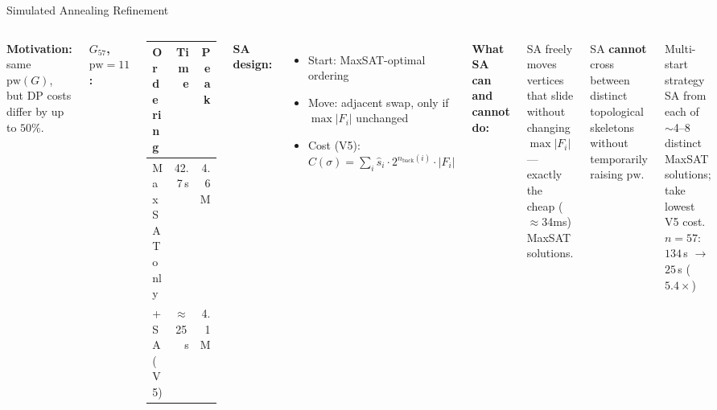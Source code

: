 \documentclass[aspectratio=169,t]{beamer}
\newcommand{\pw}{\mathrm{pw}}
\newcommand{\nb}{n_{\mathrm{back}}}
\begin{document}
\begin{frame}{Simulated Annealing Refinement}
\small
\begin{columns}[c]
\textbf{Motivation:} same $\pw(G)$, but DP costs differ by up to $50\%$.

\vspace{0.15cm}
\textbf{$G_{57}$, $\pw = 11$:}
\begin{center}\small
\begin{tabular}{lrr}
\toprule
Ordering & Time & Peak \\
\midrule
MaxSAT only & 42.7\,s & 4.6M \\
+ SA (V5) & $\approx$25\,s & 4.1M \\
\bottomrule
\end{tabular}
\end{center}

\vspace{0.1cm}
\textbf{SA design:}
\begin{itemize}
  \item Start: MaxSAT-optimal ordering
  \item Move: adjacent swap, only if $\max|F_i|$ unchanged
  \item Cost (V5): $C(\sigma)=\sum_i \hat{s}_i\cdot 2^{\nb(i)}\cdot|F_i|$
\end{itemize}

\textbf{What SA can and cannot do:}

\vspace{0.1cm}
SA freely moves vertices that slide without changing $\max|F_i|$ — exactly the cheap ($\approx$34ms) MaxSAT solutions.

\vspace{0.15cm}
SA \textbf{cannot} cross between distinct topological skeletons without temporarily raising $\pw$.

\vspace{0.1cm}
\begin{block}{Multi-start strategy}
  SA from each of $\sim$4--8 distinct MaxSAT solutions;
  take lowest V5 cost.\\[2pt]
  {\small $n=57$: $134$\,s $\to$ $25$\,s ($\mathbf{5.4\times}$)}
\end{block}
\end{columns}
\end{frame}
\end{document}

